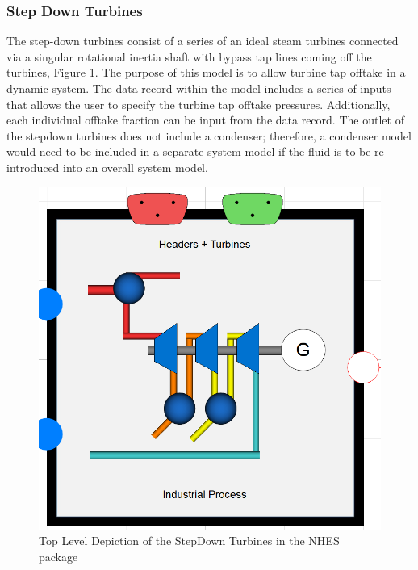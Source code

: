 \subsubsection{Step Down Turbines}

The step-down turbines consist of a series of an ideal steam turbines connected via a singular rotational inertia shaft with bypass tap lines coming off the turbines, Figure \ref{Top View Step Down Turbines}. The purpose of this model is to allow turbine tap offtake in a dynamic system. The data record within the model includes a series of inputs that allows the user to specify the turbine tap offtake pressures. Additionally, each individual offtake fraction can be input from the data record. The outlet of the stepdown turbines does not include a condenser; therefore, a condenser model would need to be included in a separate system model if the fluid is to be re-introduced into an overall system model.
 
\begin{figure}[hbtp]
\centering
\includegraphics[scale=0.3]{pics/HeaderStepdownturbines.png}
\caption{Top Level Depiction of the StepDown Turbines in the NHES package}
\label{Top View Step Down Turbines}
\end{figure}



%
